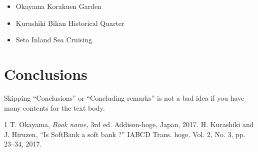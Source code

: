 \documentclass[a4paper,conference]{IEEEtran}
\begin{document}
\begin{itemize}
\item Okayama Korakuen Garden
\item Kurashiki Bikan Historical Quarter
\item Seto Inland Sea Cruising
\end{itemize}

\section{Conclusions}
Skipping ``Conclusions'' or ``Concluding remarks'' is not a 
bad idea if you have many contents for the text body. 


\begin{thebibliography}{1}
T. Okayama, \emph{Book name,} 3rd ed. Addison-hoge, Japan,
2017. 
H. Kurashiki and J. Hiruzen, ``Is SoftBank a soft bank ?'' IABCD Trans.
hoge. Vol. 2, No. 3, pp. 23--34, 2017.
\end{thebibliography}
\end{document}
